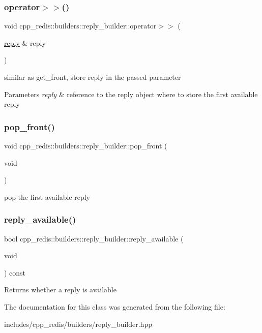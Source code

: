 \subsubsection{\texorpdfstring{operator$>$$>$()}{operator>>()}}
{\footnotesize\ttfamily void cpp\+\_\+redis\+::builders\+::reply\+\_\+builder\+::operator$>$$>$ (\begin{DoxyParamCaption}\item[{\hyperlink{classcpp__redis_1_1reply}{reply} \&}]{reply }\end{DoxyParamCaption})}

similar as get\+\_\+front, store reply in the passed parameter


\begin{DoxyParams}{Parameters}
{\em reply} & reference to the reply object where to store the first available reply \\
\hline
\end{DoxyParams}
\mbox{\label{classcpp__redis_1_1builders_1_1reply__builder_a0b5fb8dd4fc87c508e0a45647bc86b16}} 
\subsubsection{\texorpdfstring{pop\+\_\+front()}{pop\_front()}}
{\footnotesize\ttfamily void cpp\+\_\+redis\+::builders\+::reply\+\_\+builder\+::pop\+\_\+front (\begin{DoxyParamCaption}\item[{void}]{ }\end{DoxyParamCaption})}

pop the first available reply \mbox{\label{classcpp__redis_1_1builders_1_1reply__builder_af7d8e764ab591390cd1eae8801cd691c}} 
\subsubsection{\texorpdfstring{reply\+\_\+available()}{reply\_available()}}
{\footnotesize\ttfamily bool cpp\+\_\+redis\+::builders\+::reply\+\_\+builder\+::reply\+\_\+available (\begin{DoxyParamCaption}\item[{void}]{ }\end{DoxyParamCaption}) const}

\begin{DoxyReturn}{Returns}
whether a reply is available 
\end{DoxyReturn}


The documentation for this class was generated from the following file\+:\begin{DoxyCompactItemize}
\item 
includes/cpp\+\_\+redis/builders/reply\+\_\+builder.\+hpp\end{DoxyCompactItemize}
